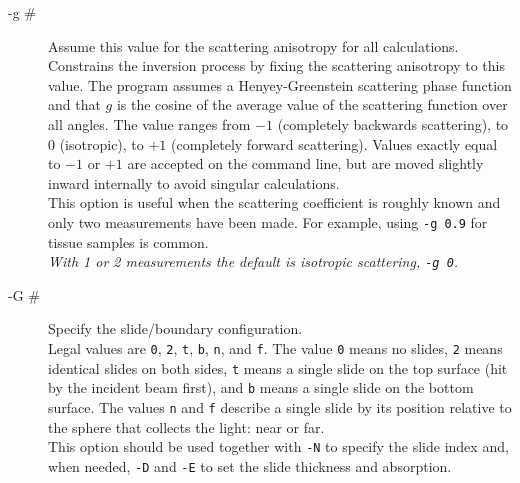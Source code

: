 \documentclass{article}
\begin{document}
\begin{description}
    \item[-g \#] Assume this value for the scattering anisotropy for all calculations.\\[1mm]
                 Constrains the inversion process by fixing the scattering anisotropy to this value.  
                 The program assumes a Henyey-Greenstein scattering phase function and that $g$ is the cosine of the average
                 value of the scattering function over all angles.  The value ranges from $-1$ (completely backwards scattering), to
                 $0$ (isotropic), to $+1$ (completely forward scattering).  Values exactly equal to $-1$ or $+1$ are
                 accepted on the command line, but are moved slightly inward internally to avoid singular calculations.\\[1mm]
                 This option is useful when the scattering coefficient is roughly known and only two 
                 measurements have been made. For example, using \texttt{-g 0.9} for tissue samples
                 is common.\\[1mm]
                 \textit{With 1 or 2 measurements the default is isotropic scattering, \texttt{-g 0}.}
    \item[-G \#] Specify the slide/boundary configuration.\\[1mm]
                 Legal values are \texttt{0}, \texttt{2}, \texttt{t}, \texttt{b},
                 \texttt{n}, and \texttt{f}.  The value \texttt{0} means no slides,
                 \texttt{2} means identical slides on both sides, \texttt{t} means
                 a single slide on the top surface (hit by the incident beam first),
                 and \texttt{b} means a single slide on the bottom surface.  The
                 values \texttt{n} and \texttt{f} describe a single slide by its
                 position relative to the sphere that collects the light: near or far.\\[1mm]
                 This option should be used together with \texttt{-N} to specify the
                 slide index and, when needed, \texttt{-D} and \texttt{-E} to set the
                 slide thickness and absorption.


\end{description}
\end{document}
